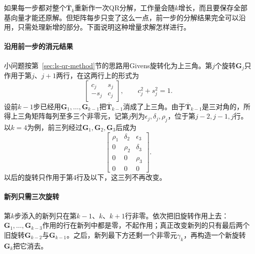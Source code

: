如果每一步都对整个$\overline{\bm T}_k$重新作一次QR分解，工作量会随$k$增长，而且要保存全部基向量才能还原解。但矩阵每步只变了这么一点，前一步的分解结果完全可以沿用，只需处理新增的部分。下面说明这种增量求解怎样进行。

\paragraph{沿用前一步的消元结果}
小问题按第~\ref{sec:ls-qr-method}节的思路用Givens旋转化为上三角。第$j$个旋转$\bm G_j$只作用于第$j$、$j+1$两行，在这两行上的形式为
\begin{equation}
 \begin{bmatrix}c_j&s_j\\-s_j&c_j\end{bmatrix},\qquad c_j^2+s_j^2=1 .
 \label{eq:ls-minres-givens}
\end{equation}
设前$k-1$步已经用$\bm G_1,\ldots,\bm G_{k-1}$把$\overline{\bm T}_{k-1}$消成了上三角。由于$\overline{\bm T}_{k-1}$是三对角的，所得上三角矩阵每列至多三个非零元，记第$j$列为$\epsilon_j,\delta_j,\rho_j$，位于第$j-2,j-1,j$行。以$k=4$为例，前三列经过$\bm G_1,\bm G_2,\bm G_3$后成为
\[
 \begin{bmatrix}
 \rho_1&\delta_2&\epsilon_3\\
 0&\rho_2&\delta_3\\
 0&0&\rho_3\\
 0&0&0
 \end{bmatrix}.
\]
以后的旋转只作用于第$4$行及以下，这三列不再改变。

\paragraph{新列只需三次旋转}
第$k$步添入的新列只在第$k-1$、$k$、$k+1$行非零。依次把旧旋转作用上去：$\bm G_1,\ldots,\bm G_{k-3}$作用的行在新列中都是零，不起作用；真正改变新列的只有最后两个旧旋转$\bm G_{k-2}$与$\bm G_{k-1}$。之后，新列最下方还剩一个非零元$\gamma_k$，再构造一个新旋转$\bm G_k$把它消去。


